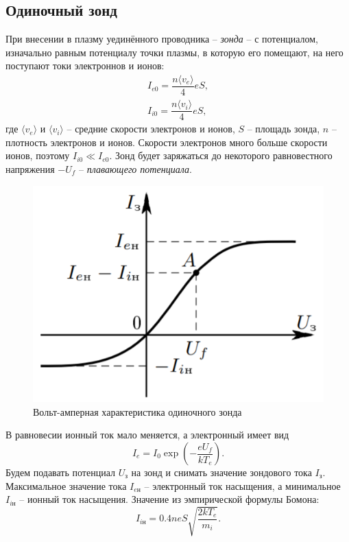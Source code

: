 \subsection*{Одиночный зонд}
При внесении в плазму уединённого проводника -- \textit{зонда} -- с потенциалом, изначально равным потенциалу точки плазмы, в которую его помещают, на него поступают токи электроннов и ионов:
\begin{equation}
    \begin{array}{c}
        I_{e0} = \dfrac{n \langle v_e \rangle}{4}eS,\\
        I_{i0} = \dfrac{n \langle v_i \rangle}{4}eS,
    \end{array}
\end{equation}
где $\langle v_e \rangle$ и $\langle v_i \rangle$ -- средние скорости электронов и ионов, $S$ -- площадь зонда, $n$ -- плотность электронов и ионов. Скорости электронов много больше скорости ионов, поэтому $I_{i0} \ll I_{e0}$. Зонд будет заряжаться до некоторого равновестного напряжения $-U_f$ -- \textit{плавающего потенциала}.\\
\begin{figure}
    \includegraphics[scale=0.5]{images/zond.png}
    \caption{Вольт-амперная характеристика одиночного зонда}
\end{figure}  
В равновесии ионный ток мало меняется, а электронный имеет вид
$$
I_e = I_0 \exp\left( -\dfrac{eU_f}{kT_e} \right).
$$
Будем подавать потенциал $U_\text{з}$ на зонд и снимать значение зондового тока $I_\text{з}$. Максимальное значение тока $I_{e\text{н}}$ -- электронный ток насыщения, а минимальное $I_{i\text{н}}$ -- ионный ток насыщения. Значение из эмпирической формулы Бомона:
\begin{equation}
    I_{i\text{н}} = 0.4 neS \sqrt{\dfrac{2kT_e}{m_i}}.
\end{equation}
